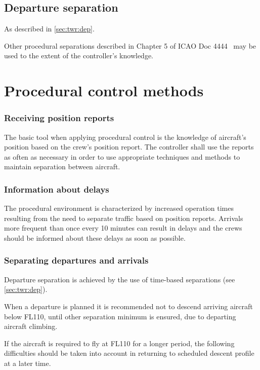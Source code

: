 \subsection{Departure separation}
As described in \cref{sec:twr:dep}.

Other procedural separations described in Chapter 5 of ICAO Doc 4444~\cite{4444}
may be used to the extent of the controller's knowledge.

\section{Procedural control methods}
\label{sec:app:procedural_methods}

\subsubsection{Receiving position reports}

The basic tool when applying procedural control is the knowledge of aircraft's
position based on the crew's position report. The controller shall use the
reports as often as necessary in order to use appropriate techniques and methods
to maintain separation between aircraft.

\subsubsection{Information about delays}

The procedural environment is characterized by increased operation times
resulting from the need to separate traffic based on position reports. Arrivals
more frequent than once every 10 minutes can result in delays and the crews
should be informed about these delays as soon as possible.

\subsubsection{Separating departures and arrivals}

Departure separation is achieved by the use of time-based separations (see
\cref{sec:twr:dep}).

When a departure is planned it is recommended not to descend arriving aircraft
below FL110, until other separation minimum is ensured, due to departing
aircraft climbing.

If the aircraft is required to fly at FL110 for a longer period, the following
difficulties should be taken into account in returning to scheduled descent
profile at a later time.

